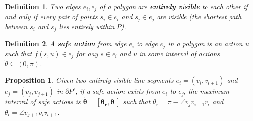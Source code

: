 \documentclass[sageh,times,Review]{sagej}
\newtheorem{proposition}{Proposition}
\newtheorem{definition}{Definition}
\begin{document}
\begin{definition}
Two edges $e_i,e_j$ of a polygon are \textbf{entirely visible} to each other if
and only if every pair of points $s_i \in e_i$ and $s_j \in e_j$ are visible (the
shortest path between $s_i$ and $s_j$ lies entirely within $P$).
\end{definition}

\begin{definition} \label{def:sa}
A \textbf{safe action} from edge $e_i$ to edge $e_j$ in a polygon is an 
action $u$ such
that $f(s,u) \in e_j$ for any $s \in e_i$ and $u$ in some interval of actions
$\tilde{\theta} \subseteq (0,\pi)$.
\end{definition}

\begin{proposition} \label{prop:saferange}
Given two entirely visible line segments $e_i = (v_i, v_{i+1})$ and $e_j =
(v_j, v_{j+1})$ in $\partial P'$, if a safe action
exists from $e_i$ to $e_j$, the maximum interval of safe actions is $\bm{\tilde{\theta} = [\theta_r, \theta_l]}$ such
that $\theta_r = \pi - \angle v_j v_{i+1} v_i$ and $\theta_l = \angle v_{j+1}
v_i v_{i+1}$.
\end{proposition}
\end{document}
